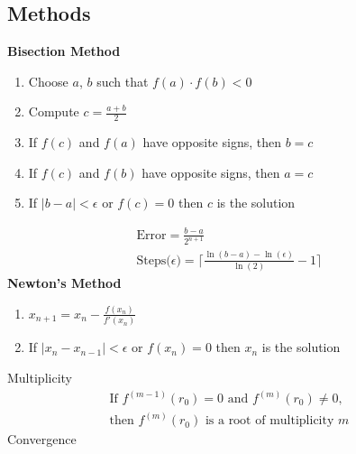 \documentclass[10pt]{article}
\begin{document}
\begin{multicols}{2}
\begin{minipage}{\columnwidth}
\begin{flushright}
            \subsection*{Methods}
            \textbf{Bisection Method}
            \begin{enumerate}
                \item Choose \(a\), \(b\) such that \(f(a) \cdot f(b) < 0\)
                \item Compute \(c = \frac{a+b}{2}\)
                \item If \(f(c)\) and \(f(a)\) have opposite signs, then \(b = c\)
                \item If \(f(c)\) and \(f(b)\) have opposite signs, then \(a = c\)
                \item If \(|b - a| < \epsilon\) or \(f(c) = 0\) then \(c\) is the solution
            \end{enumerate}
            \begin{equation*}
                \begin{aligned}
                    \text{Error} = \frac{b - a}{2^{n + 1}}                                                         & \\
                    \text{Steps(\(\epsilon\))} = \bigl\lceil \frac{\ln(b-a) - \ln(\epsilon)}{\ln(2)}-1 \bigr\rceil &
                \end{aligned}
            \end{equation*}
            \textbf{Newton's Method}
            \begin{enumerate}
                \item \(x_{n+1} = x_n - \frac{f(x_n)}{f'(x_n)}\)
                \item If \(|x_n - x_{n-1}| < \epsilon\) or \(f(x_n) = 0\) then \(x_n\) is the solution
            \end{enumerate}
            Multiplicity
            \begin{equation*}
                \begin{aligned}
                    \text{If } f^{(m-1)}(r_0) = 0 \text{ and } f^{(m)}(r_0) \neq 0 \text{,} & \\
                    \text{then } f^{(m)}(r_0) \text{ is a root of multiplicity } m          &
                \end{aligned}
            \end{equation*}
            Convergence
            \vspace*{-1em}
            \setlength{\columnsep}{-1in}

\end{flushright}
\end{minipage}
\end{multicols}
\end{document}
